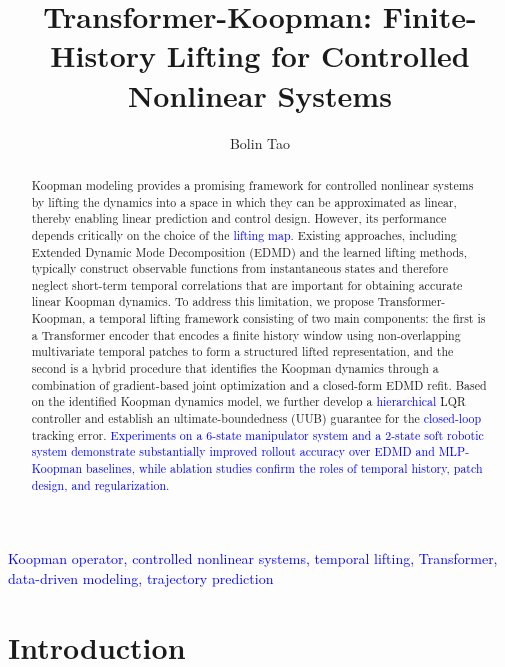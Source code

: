 \documentclass[journal]{IEEEtran}
\begin{document}
\title{Transformer-Koopman: Finite-History Lifting for Controlled Nonlinear Systems}

\author{Bolin Tao}


\maketitle

\begin{abstract}
Koopman modeling provides a promising framework for controlled nonlinear systems by lifting the dynamics into a space in which they can be approximated as linear, thereby enabling linear prediction and control design. However, its performance depends critically on the choice of the \textcolor{blue}{lifting map}. Existing approaches, including Extended Dynamic Mode Decomposition (EDMD) and the learned lifting methods, typically construct observable functions from instantaneous states and therefore neglect short-term temporal correlations that are important for obtaining accurate linear Koopman dynamics.
To address this limitation, we propose Transformer-Koopman, a temporal lifting framework consisting of two main components: the first is a Transformer encoder that encodes a finite history window using non-overlapping multivariate temporal patches to form a structured lifted representation, and the second is a hybrid procedure that identifies the Koopman dynamics through a combination of gradient-based joint optimization and a closed-form EDMD refit.
Based on the identified Koopman dynamics model, we further develop a \textcolor{blue}{hierarchical} LQR controller and establish an ultimate-boundedness (UUB) guarantee for the \textcolor{blue}{closed-loop} tracking error. \textcolor{blue}{Experiments on a 6-state manipulator system and a 2-state soft robotic system demonstrate substantially improved rollout accuracy over EDMD and MLP-Koopman baselines, while ablation studies confirm the roles of temporal history, patch design, and regularization.}
\end{abstract}

\begin{IEEEkeywords}
\textcolor{blue}{Koopman operator, controlled nonlinear systems, temporal lifting, Transformer, data-driven modeling, trajectory prediction}
\end{IEEEkeywords}

\section{Introduction}
\label{sec:introduction}
\end{document}
